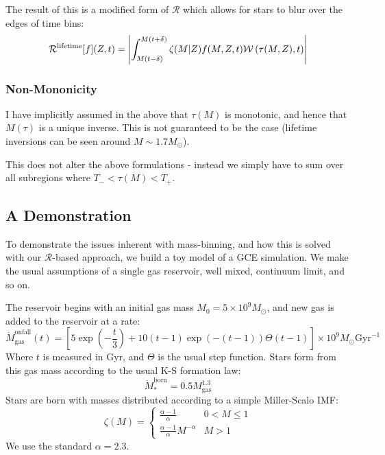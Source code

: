 \documentclass[a4paper,11pt]{article}
\begin{document}
				The result of this is a modified form of $\mathcal{R}$ which allows for stars to blur over the edges of time bins:
				\begin{equation}
					\mathcal{R}^\text{lifetime}[f](Z,t) = \left|\int_{M(t-\delta)}^{M(t+\delta)} \zeta(M|Z) f(M,Z,t) \mathcal{W}\left(\tau(M,Z),t\right)\right|
				\end{equation}

			\subsubsection{Non-Mononicity}
				I have implicitly assumed in the above that $\tau(M)$ is monotonic, and hence that $M(\tau)$ is a unique inverse. This is not guaranteed to be the case (lifetime inversions can be seen around $M\sim 1.7M_\odot$).

				This does not alter the above formulations - instead we simply have to sum over all subregions where $T_- < \tau(M) < T_+$.

		\subsection{A Demonstration}


			To demonstrate the issues inherent with mass-binning, and how this is solved with our $\mathcal{R}$-based approach, we build a toy model of a GCE simulation. We make the usual assumptions of a single gas reservoir, well mixed, continuum limit, and so on. 

			The reservoir begins with an initial gas mass $M_0 = 5\times10^9 M_\odot$, and new gas is added to the reservoir at a rate:
			\begin{equation}
				\dot{M}_\text{gas}^\text{onfall}(t) = \left[5\exp\left(-\frac{t}{3}\right) + 10(t-1)\exp(-(t-1)) \Theta(t-1)\right]\times 10^9 M_\odot \text{Gyr}^{-1}
			\end{equation}
			Where $t$ is measured in Gyr, and $\Theta$ is the usual step function. Stars form from this gas mass according to the usual K-S formation law:
			\begin{equation}
				\dot{M}_*^\text{born} = 0.5 M_\text{gas}^{1.3}
			\end{equation}
			Stars are born with masses distributed according to a simple Miller-Scalo IMF:
			\begin{equation}
				\zeta(M) = \begin{cases}
				\frac{\alpha - 1}{\alpha} & 0 < M\leq 1
				\\
				\frac{\alpha - 1}{\alpha} M^{-\alpha} & M > 1
				\end{cases}
			\end{equation}
			We use the standard $\alpha = 2.3$.
\end{document}
